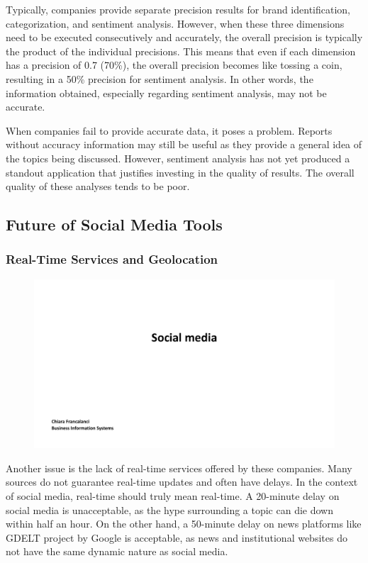 Typically, companies provide separate precision results for brand
identification, categorization, and sentiment analysis. However, when
these three dimensions need to be executed consecutively and accurately,
the overall precision is typically the product of the individual
precisions. This means that even if each dimension has a precision of
0.7 (70\%), the overall precision becomes like tossing a coin, resulting
in a 50\% precision for sentiment analysis. In other words, the
information obtained, especially regarding sentiment analysis, may not
be accurate.

When companies fail to provide accurate data, it poses a problem.
Reports without accuracy information may still be useful as they provide
a general idea of the topics being discussed. However, sentiment
analysis has not yet produced a standout application that justifies
investing in the quality of results. The overall quality of these
analyses tends to be poor.

\subsection{Future of Social Media
    Tools}\label{future-of-social-media-tools}

\subsubsection{Real-Time Services and
    Geolocation}\label{real-time-services-and-geolocation}

\begin{figure}[!h]
    \centering
    \includegraphics[page=32, trim = 1cm 4.5cm 1cm 3cm, clip, width=\textwidth]{images/04 - Social_Media.pdf}
\end{figure}

Another issue is the lack of real-time services offered by these
companies. Many sources do not guarantee real-time updates and often
have delays. In the context of social media, real-time should truly mean
real-time. A 20-minute delay on social media is unacceptable, as the
hype surrounding a topic can die down within half an hour. On the other
hand, a 50-minute delay on news platforms like GDELT project by Google is
acceptable, as news and institutional websites do not have the same
dynamic nature as social media.

